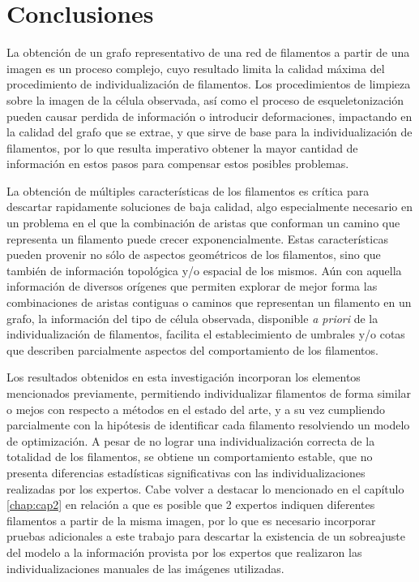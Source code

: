 \chapter{Conclusiones}
\label{chap:conclu}
La obtenci\'on de un grafo representativo de una red de filamentos a partir de una imagen es un proceso complejo, cuyo resultado limita la calidad m\'axima del procedimiento de individualizaci\'on de filamentos. Los procedimientos de limpieza sobre la imagen de la c\'elula observada, as\'i como el proceso de esqueletonizaci\'on pueden causar perdida de informaci\'on o introducir deformaciones, impactando en la calidad del grafo que se extrae, y que sirve de base para la individualizaci\'on de filamentos, por lo que resulta imperativo obtener la mayor cantidad de informaci\'on en estos pasos para compensar estos posibles problemas. 

La obtenci\'on de m\'ultiples caracter\'isticas de los filamentos es cr\'itica para descartar rapidamente soluciones de baja calidad, algo especialmente necesario en un problema en el que la combinaci\'on de aristas que conforman un camino que representa un filamento puede crecer exponencialmente. Estas caracter\'isticas pueden provenir no s\'olo de aspectos geom\'etricos de los filamentos, sino que tambi\'en de informaci\'on topol\'ogica y/o espacial de los mismos.
A\'un con aquella informaci\'on de diversos or\'igenes que permiten explorar de mejor forma las combinaciones de aristas contiguas o caminos que representan un filamento en un grafo, la informaci\'on del tipo de c\'elula observada, disponible {\it a priori} de la individualizaci\'on de filamentos, facilita el establecimiento de umbrales y/o cotas que describen parcialmente aspectos del comportamiento de los filamentos.

Los resultados obtenidos en esta investigaci\'on incorporan los elementos mencionados previamente, permitiendo individualizar filamentos de forma similar o mejos con respecto a m\'etodos en el estado del arte, y a su vez cumpliendo parcialmente con la hip\'otesis de identificar cada filamento resolviendo un modelo de optimizaci\'on. A pesar de no lograr una individualizaci\'on correcta de la totalidad de los filamentos, se obtiene un comportamiento estable, que no presenta diferencias estad\'isticas significativas con las individualizaciones realizadas por los expertos. Cabe volver a destacar lo mencionado en el cap\'itulo \ref{chap:cap2} en relaci\'on a que es posible que 2 expertos indiquen diferentes filamentos a partir de la misma imagen, por lo que es necesario incorporar pruebas adicionales a este trabajo para descartar la existencia de un sobreajuste del modelo a la informaci\'on provista por los expertos que realizaron las individualizaciones manuales de las im\'agenes utilizadas.



